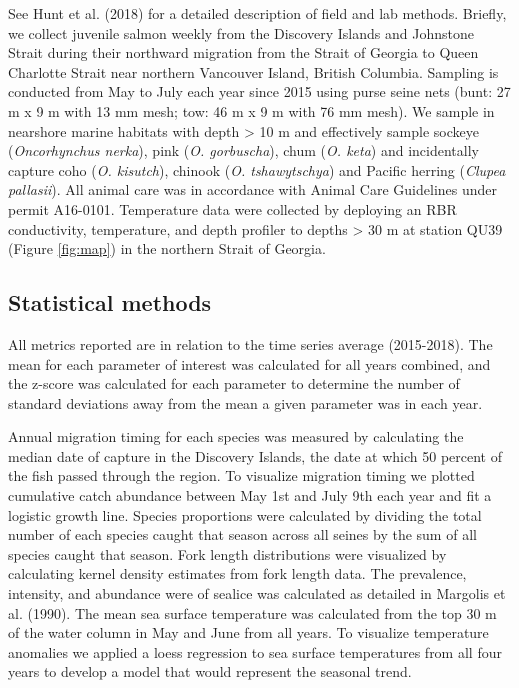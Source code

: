 \documentclass[fleqn,10pt]{wlpeerj} %
\begin{document}
See Hunt et al. (2018) for a detailed description of field and lab
methods. Briefly, we collect juvenile salmon weekly from the Discovery
Islands and Johnstone Strait during their northward migration from the
Strait of Georgia to Queen Charlotte Strait near northern Vancouver
Island, British Columbia. Sampling is conducted from May to July each
year since 2015 using purse seine nets (bunt: 27 m x 9 m with 13 mm
mesh; tow: 46 m x 9 m with 76 mm mesh). We sample in nearshore marine
habitats with depth \textgreater{} 10 m and effectively sample sockeye
(\emph{Oncorhynchus nerka}), pink (\emph{O. gorbuscha}), chum (\emph{O.
keta}) and incidentally capture coho (\emph{O. kisutch}), chinook
(\emph{O. tshawytschya}) and Pacific herring (\emph{Clupea pallasii}).
All animal care was in accordance with Animal Care Guidelines under
permit A16-0101. Temperature data were collected by deploying an RBR
conductivity, temperature, and depth profiler to depths \textgreater{}
30 m at station QU39 (Figure \ref{fig:map}) in the northern Strait of
Georgia.

\subsection*{Statistical methods}\label{statistical-methods}

All metrics reported are in relation to the time series average
(2015-2018). The mean for each parameter of interest was calculated for
all years combined, and the z-score was calculated for each parameter to
determine the number of standard deviations away from the mean a given
parameter was in each year.

Annual migration timing for each species was measured by calculating the
median date of capture in the Discovery Islands, the date at which 50
percent of the fish passed through the region. To visualize migration
timing we plotted cumulative catch abundance between May 1st and July
9th each year and fit a logistic growth line. Species proportions were
calculated by dividing the total number of each species caught that
season across all seines by the sum of all species caught that season.
Fork length distributions were visualized by calculating kernel density
estimates from fork length data. The prevalence, intensity, and
abundance were of sealice was calculated as detailed in Margolis et al.
(1990). The mean sea surface temperature was calculated from the top 30
m of the water column in May and June from all years. To visualize
temperature anomalies we applied a loess regression to sea surface
temperatures from all four years to develop a model that would represent
the seasonal trend.
\end{document}
